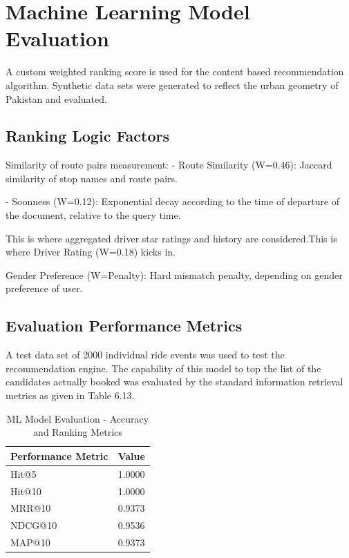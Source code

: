 
\section{Machine Learning Model Evaluation}

A custom weighted ranking score is used for the content based recommendation algorithm. Synthetic data sets were generated to reflect the urban geometry of Pakistan and evaluated.

\subsection{Ranking Logic Factors}
Similarity of route pairs measurement: - Route Similarity (W=0.46): Jaccard similarity of stop names and route pairs.

- Soonness (W=0.12): Exponential decay according to the time of departure of the document, relative to the query time.

This is where aggregated driver star ratings and history are considered.This is where Driver Rating (W=0.18) kicks in.

Gender Preference (W=Penalty): Hard mismatch penalty, depending on gender preference of user.

\subsection{Evaluation Performance Metrics}

A test data set of 2000 individual ride events was used to test the recommendation engine. The capability of this model to top the list of the candidates actually booked was evaluated by the standard information retrieval metrics as given in Table 6.13.

\begin{table}[H]
\centering
\caption{ML Model Evaluation - Accuracy and Ranking Metrics}
\renewcommand{\arraystretch}{1.5}
\setlength{\tabcolsep}{15pt}
\begin{tabular}{|l|c|}
\hline
\rowcolor{gray!15} \textbf{Performance Metric} & \textbf{Value} \\
\hline
Hit@5 & 1.0000 \\
\hline
Hit@10 & 1.0000 \\
\hline
MRR@10 & 0.9373 \\
\hline
NDCG@10 & 0.9536 \\
\hline
MAP@10 & 0.9373 \\
\hline
\end{tabular}
\end{table}

